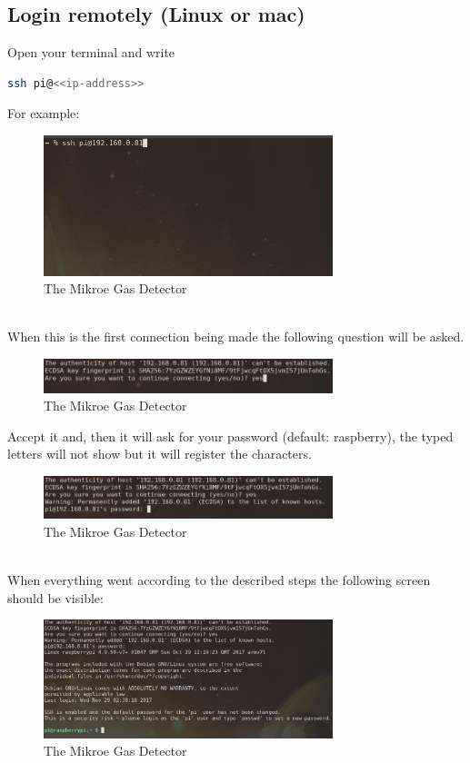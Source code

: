 \documentclass[11pt]{report}
\begin{document}
		\subsection{Login remotely (Linux or mac)}
			Open your terminal and write 
			\begin{lstlisting}[language=sh]
ssh pi@<<ip-address>>
			\end{lstlisting}
			For example:
			\begin{figure}[ht]
				\centering
				\includegraphics[width=0.75\textwidth]{images/pi/login_ssh_nix.jpg} 
				\caption{The Mikroe Gas Detector}
			\end{figure}\\
			When this is the first connection being made the following question will be asked.
			\begin{figure}[ht]
				\centering
				\includegraphics[width=0.75\textwidth]{images/pi/login_ssh_nix_2.jpg} 
				\caption{The Mikroe Gas Detector}
			\end{figure}
			\newpage
			Accept it and, then it will ask for your password (default: raspberry), the typed letters will not show but it will register the characters.
			\begin{figure}[ht]
				\centering
				\includegraphics[width=0.75\textwidth]{images/pi/login_ssh_nix_3.jpg} 
				\caption{The Mikroe Gas Detector}
			\end{figure}\\
			When everything went according to the described steps the following screen should be visible:
		\begin{figure}[ht]
			\centering
			\includegraphics[width=0.75\textwidth]{images/pi/login_ssh_nix_4.jpg} 
			\caption{The Mikroe Gas Detector}
		\end{figure}
\end{document}
